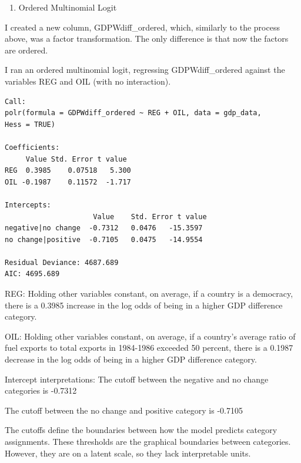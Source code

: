 \documentclass[12pt,letterpaper]{article}
\begin{document}
\begin{enumerate}
	\item [(2)] Ordered Multinomial Logit
\end{enumerate}

\noindent I created a new column, GDPWdiff\_ordered, which, similarly to the process above, was a factor transformation. The only difference is that now the factors are ordered.



\noindent I ran an ordered multinomial logit, regressing GDPWdiff\_ordered against the variables REG and OIL (with no interaction). 



\begin{verbatim}
Call:
polr(formula = GDPWdiff_ordered ~ REG + OIL, data = gdp_data, 
Hess = TRUE)

Coefficients:
     Value Std. Error t value
REG  0.3985    0.07518   5.300
OIL -0.1987    0.11572  -1.717

Intercepts:
                     Value    Std. Error t value 
negative|no change  -0.7312   0.0476   -15.3597
no change|positive  -0.7105   0.0475   -14.9554

Residual Deviance: 4687.689 
AIC: 4695.689 
\end{verbatim}

\noindent REG: Holding other variables constant, on average, if a country is a democracy, there is a 0.3985 increase in the log odds of being in a higher GDP difference category.

\vspace{.25cm}

\noindent OIL: Holding other variables constant, on average, if a country's average ratio of fuel exports to total exports in 1984-1986 exceeded 50 percent, there is a 0.1987 decrease in the log odds of being in a higher GDP difference category.

\vspace{.25cm}

\noindent Intercept interpretations:
\noindent The cutoff between the negative and no change categories is -0.7312

\noindent The cutoff between the no change and positive category is -0.7105 

\noindent The cutoffs define the boundaries between how the model predicts category assignments. These thresholds are the graphical boundaries between categories. However, they are on a latent scale, so they lack interpretable units. 
\end{document}
